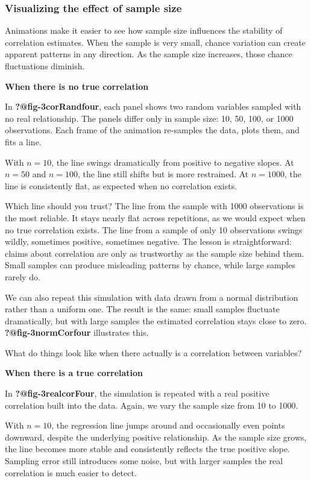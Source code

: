 \documentclass[
  letterpaper,
  DIV=11,
  numbers=noendperiod]{scrreprt}
\begin{document}
\subsubsection{Visualizing the effect of sample
size}\label{visualizing-the-effect-of-sample-size}

Animations make it easier to see how sample size influences the
stability of correlation estimates. When the sample is very small,
chance variation can create apparent patterns in any direction. As the
sample size increases, those chance fluctuations diminish.

\textbf{When there is no true correlation}

In \textbf{?@fig-3corRandfour}, each panel shows two random variables
sampled with no real relationship. The panels differ only in sample
size: 10, 50, 100, or 1000 observations. Each frame of the animation
re-samples the data, plots them, and fits a line.

With \(n=10\), the line swings dramatically from positive to negative
slopes. At \(n=50\) and \(n=100\), the line still shifts but is more
restrained. At \(n=1000\), the line is consistently flat, as expected
when no correlation exists.

Which line should you trust? The line from the sample with 1000
observations is the most reliable. It stays nearly flat across
repetitions, as we would expect when no true correlation exists. The
line from a sample of only 10 observations swings wildly, sometimes
positive, sometimes negative. The lesson is straightforward: claims
about correlation are only as trustworthy as the sample size behind
them. Small samples can produce misleading patterns by chance, while
large samples rarely do.

We can also repeat this simulation with data drawn from a normal
distribution rather than a uniform one. The result is the same: small
samples fluctuate dramatically, but with large samples the estimated
correlation stays close to zero. \textbf{?@fig-3normCorfour} illustrates
this.

What do things look like when there actually is a correlation between
variables?

\textbf{When there is a true correlation}

In \textbf{?@fig-3realcorFour}, the simulation is repeated with a real
positive correlation built into the data. Again, we vary the sample size
from 10 to 1000.

With \(n=10\), the regression line jumps around and occasionally even
points downward, despite the underlying positive relationship. As the
sample size grows, the line becomes more stable and consistently
reflects the true positive slope. Sampling error still introduces some
noise, but with larger samples the real correlation is much easier to
detect.
\end{document}
